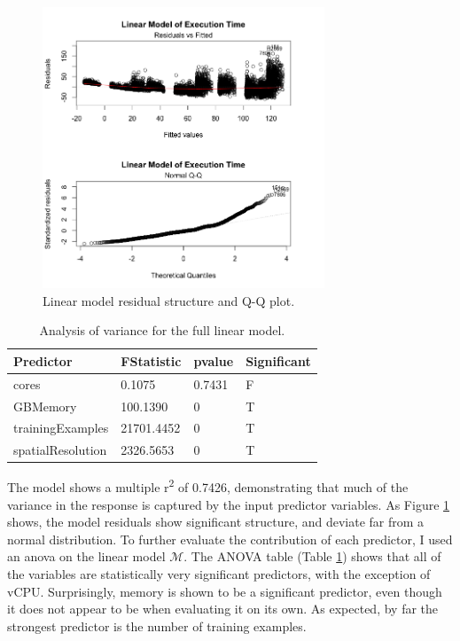 \documentclass[a4paper]{article}
\begin{document}
\begin{figure}
\centering
\includegraphics[width=0.75\textwidth]{residuals_and_QQ.png}
\caption{\label{fig:modelStats}Linear model residual structure and Q-Q plot.}
\end{figure}

\begin{table}
\centering
\begin{tabular}{l|l| l | l|}
Predictor & FStatistic & pvalue & Significant\\\hline
cores & 0.1075 & 0.7431 & F\\
GBMemory & 100.1390 & 0 & T\\
trainingExamples & 21701.4452 & 0 & T\\
spatialResolution & 2326.5653 & 0 & T\\
\end{tabular}
\caption{\label{tab:anova}Analysis of variance for the full linear model.}
\end{table}

The model shows a multiple r\textsuperscript{2} of 0.7426, demonstrating that much of the variance in the response is captured by the input predictor variables.  As Figure \ref{fig:modelStats} shows, the model residuals show significant structure, and deviate far from a normal distribution.  To further evaluate the contribution of each predictor, I used an anova on the linear model $\mathcal{M}$.  The ANOVA table (Table \ref{tab:anova}) shows that all of the variables are statistically very significant predictors, with the exception of vCPU. Surprisingly, memory is shown to be a significant predictor, even though it does not appear to be when evaluating it on its own.  As expected, by far the strongest predictor is the number of training examples.
\end{document}
